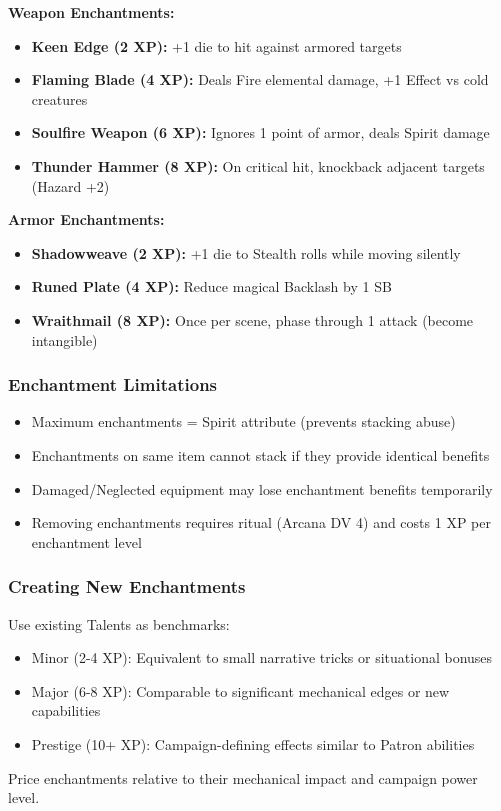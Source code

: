 \textbf{Weapon Enchantments:}
\begin{itemize}
\item \textbf{Keen Edge (2 XP):} +1 die to hit against armored targets
\item \textbf{Flaming Blade (4 XP):} Deals Fire elemental damage, +1 Effect vs cold creatures
\item \textbf{Soulfire Weapon (6 XP):} Ignores 1 point of armor, deals Spirit damage
\item \textbf{Thunder Hammer (8 XP):} On critical hit, knockback adjacent targets (Hazard +2)
\end{itemize}

\textbf{Armor Enchantments:}
\begin{itemize}
\item \textbf{Shadowweave (2 XP):} +1 die to Stealth rolls while moving silently
\item \textbf{Runed Plate (4 XP):} Reduce magical Backlash by 1 SB
\item \textbf{Wraithmail (8 XP):} Once per scene, phase through 1 attack (become intangible)
\end{itemize}

\subsubsection{Enchantment Limitations}

\begin{itemize}
\item Maximum enchantments = Spirit attribute (prevents stacking abuse)
\item Enchantments on same item cannot stack if they provide identical benefits
\item Damaged/Neglected equipment may lose enchantment benefits temporarily
\item Removing enchantments requires ritual (Arcana DV 4) and costs 1 XP per enchantment level
\end{itemize}

\subsubsection{Creating New Enchantments}

Use existing Talents as benchmarks:
\begin{itemize}
\item Minor (2-4 XP): Equivalent to small narrative tricks or situational bonuses
\item Major (6-8 XP): Comparable to significant mechanical edges or new capabilities
\item Prestige (10+ XP): Campaign-defining effects similar to Patron abilities
\end{itemize}

Price enchantments relative to their mechanical impact and campaign power level.
